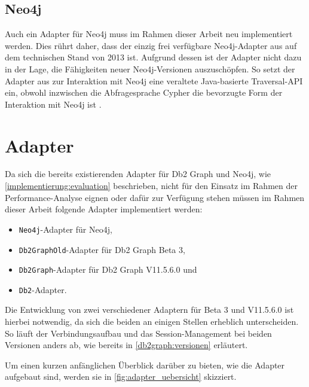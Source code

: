 \subsection{Neo4j}
\label{implementierung:evaluation:neo4j}
Auch ein Adapter für Neo4j muss im Rahmen dieser Arbeit neu implementiert werden. Dies rührt daher, dass der einzig frei verfügbare Neo4j-Adapter aus \cite{neo_linkbench_github} auf dem technischen Stand von 2013 ist. Aufgrund dessen ist der Adapter nicht dazu in der Lage, die Fähigkeiten neuer Neo4j-Versionen auszuschöpfen. So setzt der Adapter aus \cite{neo_linkbench_github} zur Interaktion mit Neo4j eine veraltete Java-basierte Traversal-API ein, obwohl inzwischen die Abfragesprache Cypher die bevorzugte Form der Interaktion mit Neo4j ist \cite{gdbms}.

\section{Adapter}
\label{implementierung:adapter}
Da sich die bereits existierenden Adapter für Db2 Graph und Neo4j, wie \autoref{implementierung:evaluation} beschrieben, nicht für den Einsatz im Rahmen der Performance-Analyse eignen oder dafür zur Verfügung stehen müssen im Rahmen dieser Arbeit folgende Adapter implementiert werden:
\begin{itemize}
    \item \texttt{Neo4j}-Adapter für Neo4j,
    \item \texttt{Db2GraphOld}-Adapter für Db2 Graph Beta 3, 
    \item \texttt{Db2Graph}-Adapter für Db2 Graph V11.5.6.0 und
    \item \texttt{Db2}-Adapter.
\end{itemize}
Die Entwicklung von zwei verschiedener Adaptern für Beta 3 und V11.5.6.0 ist hierbei notwendig, da sich die beiden an einigen Stellen erheblich unterscheiden. So läuft der Verbindungsaufbau und das Session-Management bei beiden Versionen anders ab, wie bereits in \autoref{db2graph:versionen} erläutert. 

Um einen kurzen anfänglichen Überblick darüber zu bieten, wie die Adapter aufgebaut sind, werden sie in \autoref{fig:adapter_uebersicht} skizziert.

